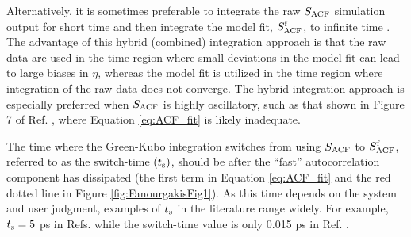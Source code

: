 \documentclass[9pt,bestpractices]{livecoms}
\begin{document}

Alternatively, it is sometimes preferable to integrate the raw $S_{\rm ACF}$ simulation output for short time and then integrate the model fit, $S^{\rm f}_{\rm ACF}$, to infinite time \cite{vanderSpoel1998,Shirts2013,Fernandez2005}. The advantage of this hybrid (combined) integration approach is that the raw data are used in the time region where small deviations in the model fit can lead to large biases in $\eta$, whereas the model fit is utilized in the time region where integration of the raw data does not converge. The hybrid integration approach is especially preferred when $S_{\rm ACF}$ is highly oscillatory, such as that shown in Figure 7 of Ref. \cite{Fernandez2005}, where Equation \ref{eq:ACF_fit} is likely inadequate. 

The time where the Green-Kubo integration switches from using $S_{\rm ACF}$ to $S^{\rm f}_{\rm ACF}$, referred to as the switch-time $(t_{\rm s})$, should be after the ``fast'' autocorrelation component has dissipated (the first term in Equation \ref{eq:ACF_fit} and the red dotted line in Figure \ref{fig:FanourgakisFig1}). As this time depends on the system and user judgment, examples of $t_{\rm s}$ in the literature range widely. For example, $t_{\rm s} = 5$ ps in Refs. \cite{vanderSpoel1998,Shirts2013} while the switch-time value is only 0.015 ps in Ref. \cite{Fernandez2005}.  
\end{document}
